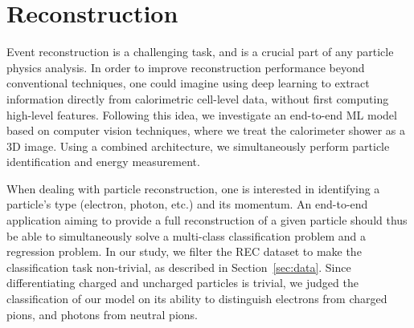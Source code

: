 \chapter{Reconstruction}

Event reconstruction is a challenging task, and is a crucial part of any particle physics analysis. In order to improve reconstruction performance beyond conventional techniques, one could imagine using deep learning to extract information directly from calorimetric cell-level data, without first computing high-level features. Following this idea, we investigate an end-to-end ML model based on computer vision techniques, where we treat the calorimeter shower as a 3D image. Using a combined architecture, we simultaneously perform particle identification and energy measurement.

When dealing with particle reconstruction, one is interested in identifying a particle's type (electron, photon, etc.) and its momentum. An end-to-end application aiming to provide a full reconstruction of a given particle should thus be able to simultaneously solve a multi-class classification problem and a regression problem. In our study, we filter the REC dataset to make the classification task non-trivial, as described in Section~\ref{sec:data}. Since differentiating charged and uncharged particles is trivial, we judged the classification of our model on its ability to distinguish electrons from charged pions, and photons from neutral pions.

